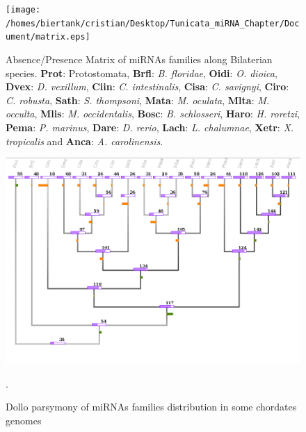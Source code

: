 \documentclass[11pt]{article}
\begin{document}
\begin{figure}[htp]
 \centering
 
\texttt{[image: 
/homes/biertank/cristian/Desktop/Tunicata\_miRNA\_Chapter/Document/matrix.eps]}
 \caption{Absence/Presence Matrix of miRNAs families along Bilaterian species. 
\textbf{Prot}: Protostomata, \textbf{Brfl}: \textit{B. floridae}, 
\textbf{Oidi}: \textit{O. dioica}, \textbf{Dvex}: \textit{D. vexillum}, 
\textbf{Ciin}: \textit{C. intestinalis}, \textbf{Cisa}: \textit{C. savignyi}, 
\textbf{Ciro}: \textit{C. robusta}, \textbf{Sath}: \textit{S. thompsoni}, 
\textbf{Mata}: \textit{M. oculata}, \textbf{Mlta}: \textit{M. occulta}, 
\textbf{Mlis}: \textit{M. occidentalis}, \textbf{Bosc}: \textit{B. schlosseri}, 
\textbf{Haro}: \textit{H. roretzi}, \textbf{Pema}: \textit{P. marinus}, 
\textbf{Dare}: \textit{D. rerio}, \textbf{Lach}: \textit{L. chalumnae}, 
\textbf{Xetr}: \textit{X. tropicalis} and \textbf{Anca}: \textit{A. 
carolinensis}. }
 \label{fig:matrimirnas}
\end{figure}

\begin{figure}[ht]
\centering
\includegraphics[scale=0.6]{./finalTree.png}
\caption{Dollo parsymony of miRNAs families distribution in some 
chordates genomes}.
\label{fig:dollotree}
\end{figure}


\newpage



\end{document}
